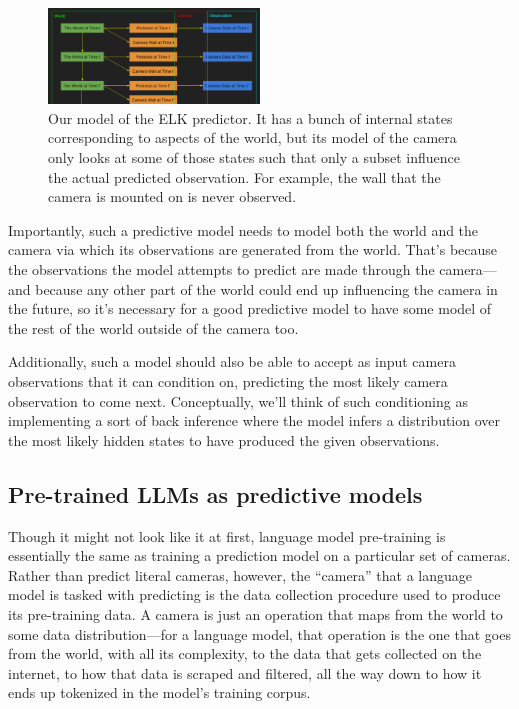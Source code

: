 \documentclass[
  twocolumn,
  natbib,
]{miri-tech-article}
\begin{document}
\begin{figure}[h!]
  \centering
  \includegraphics[width=0.5\textwidth]{OTzdgch.png}
  \caption{Our model of the ELK predictor. It has a bunch of internal states corresponding to aspects of the world, but its model of the camera only looks at some of those states such that only a subset influence the actual predicted observation. For example, the wall that the camera is mounted on is never observed.}
\end{figure}

Importantly, such a predictive model needs to model both the world and the camera via which its observations are generated from the world. That's because the observations the model attempts to predict are made through the camera---and because any other part of the world could end up influencing the camera in the future, so it's necessary for a good predictive model to have some model of the rest of the world outside of the camera too.

Additionally, such a model should also be able to accept as input camera observations that it can condition on, predicting the most likely camera observation to come next. Conceptually, we'll think of such conditioning as implementing a sort of back inference where the model infers a distribution over the most likely hidden states to have produced the given observations.


\subsection{Pre-trained LLMs as predictive models}

Though it might not look like it at first, language model pre-training is essentially the same as training a prediction model on a particular set of cameras. Rather than predict literal cameras, however, the ``camera'' that a language model is tasked with predicting is the data collection procedure used to produce its pre-training data. A camera is just an operation that maps from the world to some data distribution---for a language model, that operation is the one that goes from the world, with all its complexity, to the data that gets collected on the internet, to how that data is scraped and filtered, all the way down to how it ends up tokenized in the model's training corpus.
\end{document}
